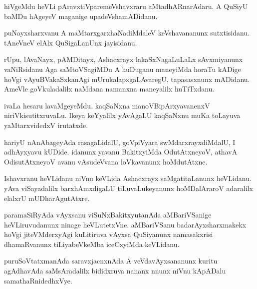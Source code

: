 \documentclass{article}
\begin{document}
\begin{mn}%
hiVgeMdu heVLi pAravxtiVparemeVshavxraru aMtadhARnarAdaru. A QuSiyU baMDu hAgeyeV maganige 
upadeVshamADidanu.
\end{mn}

\begin{mn}%
puNayxsharxvanu A maMtarxgarxhaNadiMdaleV keVshavananunx sutxtisidanu. tAneVneV elAlx 
QuSigaLanUnx jayisidanu.
\end{mn}

\begin{mn}%
rUpu, lAvaNayx, pAMDitayx, Ashacxrayx lakaSxNagaLuLaLx sAvxmiyanunx vaNiRsidanu Aga 
saMtoVSagiMDu A huDuganu maneyiMda  horaTu kADige hoVgi vAyuBVakaSxkanAgi 
mUrukalapxgaLAvaregU, tapasasxnunx mADidanu. AmeVle goVkuladalilx naMdana namanxna 
maneyalilx huTiTxdanu.
\end{mn}

\begin{mn}%
ivaLa hesaru lavaMgeyeMdu. kaqSaNxna manoVBipArxyavanenxV niriVkisutitxruvaLu. Ikeya 
keYyalilx yAvAgaLU kaqSaNxnu muKa toLayuva yaMtarxvidedxV irutatxde.
\end{mn}

\begin{mn}%
hariyU nAnAbageyAda rasagaLidalU, goVpiVyara swMdarxrayxdiMdalU, I adhAyxyavu kUDide. 
idanunx yavanu BakitxyiMda OdutAtxneyoV, athavA OdisutAtxneyoV avanu vAsudeVvana 
loVkavanunx hoMdutAtxne.
\end{mn}


\begin{mn}%
Ishavxranu heVLidanu niVnu keVLida Ashacxrayx saMgatitaLanunx heVLidanu. yAva viSayadalilx 
barxhAmxdigaLU tiLuvaLukeyanunx hoMDalAraroV adaralilx elalxrU mUDharAgutAtxre.
\end{mn}

\begin{mn}%
paramaSiRyAda vAyxsanu viSuNxBakitxyutanAda aMBariVSanige heVLiruvudanunx ninage 
heVLutetxVne. aMBariVSanu badarAyxsharxmakekx hoVgi jiteVMderxyAgi kuLitiruva vAyxsa 
QuSiyanunx namasakxrisi dhamaRvanunx tiLiyabeVkeMba iceCxyiMda keVLidanu.
\end{mn}

\begin{mn}%
puruSoVtatxmanAda saravxjacnxnAda A veVdavAyxsananunx kuritu agAdhavAda saMsAradalilx 
bididxruva nananx nnunx niVnu kApADalu samathaRnidedhxVye.
\end{mn}
\end{document}
